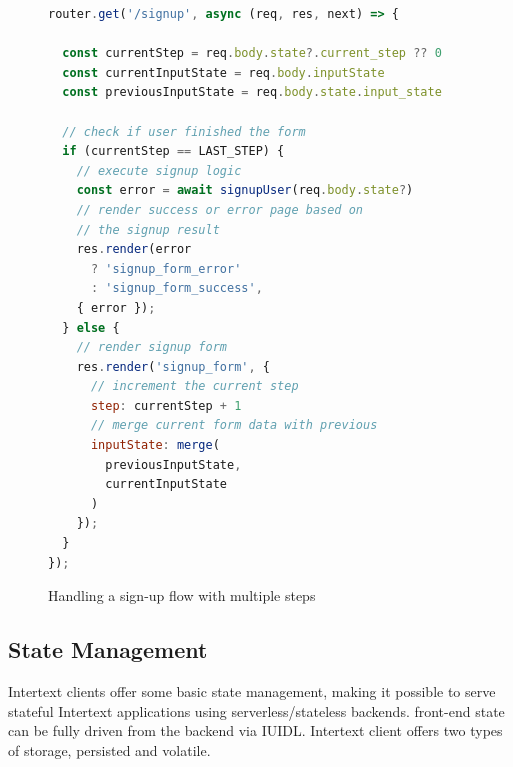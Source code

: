 \begin{figure}
\begin{minipage}{\linewidth}
\begin{lstlisting}[language=javascript]
router.get('/signup', async (req, res, next) => {
  
  const currentStep = req.body.state?.current_step ?? 0
  const currentInputState = req.body.inputState
  const previousInputState = req.body.state.input_state
  
  // check if user finished the form
  if (currentStep == LAST_STEP) {
    // execute signup logic
    const error = await signupUser(req.body.state?)
    // render success or error page based on
    // the signup result
    res.render(error
      ? 'signup_form_error'
      : 'signup_form_success',
    { error });
  } else {
    // render signup form
    res.render('signup_form', {
      // increment the current step
      step: currentStep + 1
      // merge current form data with previous
      inputState: merge(
        previousInputState,
        currentInputState
      )
    });
  }
});
\end{lstlisting}
\end{minipage}
\caption{Handling a sign-up flow with multiple steps}%
\label{fig:state_signup_progress_js}%
\end{figure}

\subsection{State Management}

Intertext clients offer some basic state management, making it possible to serve stateful Intertext applications using serverless/stateless backends. front-end state can be fully driven from the backend via IUIDL. Intertext client offers two types of storage, persisted and volatile. 

